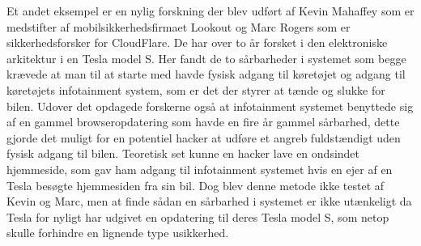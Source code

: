Et andet eksempel er en nylig forskning der blev udført af Kevin Mahaffey som er medstifter af mobilsikkerhedsfirmaet Lookout og Marc Rogers som er sikkerhedsforsker for CloudFlare. De har over to år forsket i den elektroniske arkitektur i en Tesla model S. Her fandt de to sårbarheder i systemet som begge krævede at man til at starte med havde fysisk adgang til køretøjet og adgang til køretøjets infotainment system, som er det der styrer at tænde og slukke for bilen. Udover det opdagede forskerne også at infotainment systemet benyttede sig af en gammel browseropdatering som havde en fire år gammel sårbarhed, dette gjorde det muligt for en potentiel hacker at udføre et angreb fuldstændigt uden fysisk adgang til bilen. Teoretisk set kunne en hacker lave en ondsindet hjemmeside, som gav ham adgang til infotainment systemet hvis en ejer af en Tesla besøgte hjemmesiden fra sin bil. Dog blev denne metode ikke testet af Kevin og Marc, men at finde sådan en sårbarhed i systemet er ikke utænkeligt da Tesla for nyligt har udgivet en opdatering til deres Tesla model S, som netop skulle forhindre en lignende type usikkerhed.  